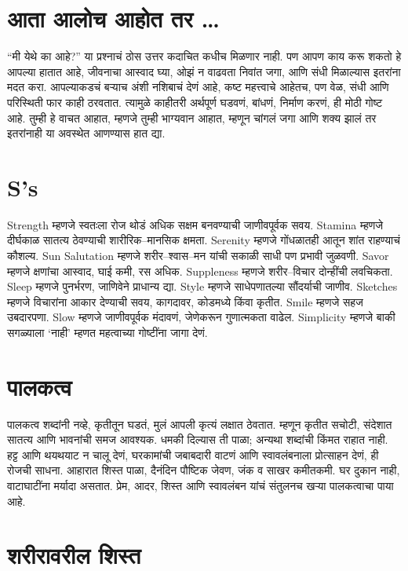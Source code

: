 \section*{आता आलोच आहोत तर \ldots}

“मी येथे का आहे?” या प्रश्नाचं ठोस उत्तर कदाचित कधीच मिळणार नाही. पण आपण काय करू शकतो हे आपल्या हातात आहे, जीवनाचा आस्वाद घ्या, ओझं न वाढवता निवांत जगा, आणि संधी मिळाल्यास इतरांना मदत करा. आपल्याकडचं बऱ्याच अंशी नशिबाचं देणं आहे, कष्ट महत्त्वाचे आहेतच, पण वेळ, संधी आणि परिस्थिती फार काही ठरवतात. त्यामुळे काहीतरी अर्थपूर्ण घडवणं, बांधणं, निर्माण करणं, ही मोठी गोष्ट आहे. तुम्ही हे वाचत आहात, म्हणजे तुम्ही भाग्यवान आहात, म्हणून चांगलं जगा आणि शक्य झालं तर इतरांनाही या अवस्थेत आणण्यास हात द्या.

\section*{S’s}

Strength म्हणजे स्वतःला रोज थोडं अधिक सक्षम बनवण्याची जाणीवपूर्वक सवय. Stamina म्हणजे दीर्घकाळ सातत्य ठेवण्याची शारीरिक–मानसिक क्षमता. Serenity म्हणजे गोंधळातही आतून शांत राहण्याचं कौशल्य. Sun Salutation म्हणजे शरीर–श्वास–मन यांची सकाळी साधी पण प्रभावी जुळवणी. Savor म्हणजे क्षणांचा आस्वाद, घाई कमी, रस अधिक. Suppleness म्हणजे शरीर–विचार दोन्हींची लवचिकता. Sleep म्हणजे पुनर्भरण, जाणिवेने प्राधान्य द्या. Style म्हणजे साधेपणातल्या सौंदर्याची जाणीव. Sketches म्हणजे विचारांना आकार देण्याची सवय, कागदावर, कोडमध्ये किंवा कृतीत. Smile म्हणजे सहज उबदारपणा. Slow म्हणजे जाणीवपूर्वक मंदावणं, जेणेकरून गुणात्मकता वाढेल. Simplicity म्हणजे बाकी सगळ्याला ‘नाही’ म्हणत महत्वाच्या गोष्टींना जागा देणं.

\section*{पालकत्व}

पालकत्व शब्दांनी नव्हे, कृतीतून घडतं, मुलं आपली कृत्यं लक्षात ठेवतात. म्हणून कृतीत सचोटी, संदेशात सातत्य आणि भावनांची समज आवश्यक. धमकी दिल्यास ती पाळा; अन्यथा शब्दांची किंमत राहात नाही. हट्ट आणि थयथयाट न चालू देणं, घरकामांची जबाबदारी वाटणं आणि स्वावलंबनाला प्रोत्साहन देणं, ही रोजची साधना. आहारात शिस्त पाळा, दैनंदिन पौष्टिक जेवण, जंक व साखर कमीतकमी. घर दुकान नाही, वाटाघाटींना मर्यादा असतात. प्रेम, आदर, शिस्त आणि स्वावलंबन यांचं संतुलनच खऱ्या पालकत्वाचा पाया आहे.

\section*{शरीरावरील शिस्त}

